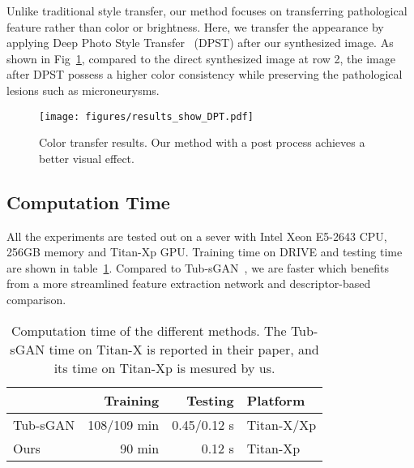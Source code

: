 \documentclass[letterpaper]{article} %
\begin{document}
        Unlike traditional style transfer,  our method focuses on transferring pathological feature rather than color or brightness. Here, we transfer the appearance by applying Deep Photo Style Transfer~\cite{DBLP:conf/cvpr/LuanPSB17} (DPST) after our synthesized image. As shown in Fig~\ref{fig:results_show_DPT}, compared to the direct synthesized image at row 2, the image after DPST possess a higher color consistency while preserving the  pathological lesions such as microneurysms.










	\begin{figure}[h!]
		\begin{center}
			\texttt{[image: figures/results\_show\_DPT.pdf]}
		\end{center}
		\caption{Color transfer results. Our method with a post process achieves a better visual effect. }
		\label{fig:results_show_DPT}
	\end{figure}

	\subsection{Computation Time}

	All the experiments are tested out on a sever with Intel Xeon E5-2643 CPU, 256GB memory and Titan-Xp GPU. Training time on DRIVE and testing time are shown in table~\ref{tab:computation_time}. Compared to Tub-sGAN~\cite{zhao2018synthesizing}, we are faster which benefits from a more streamlined feature extraction network and descriptor-based comparison.

	\begin{table}[h!]
		\begin{center}
		\begin{tabularx}{\columnwidth}{XrrX}
			\hline
			 & Training & Testing & Platform \\ \hline
			Tub-sGAN & 108/109 min & 0.45/0.12 s & Titan-X/Xp \\
			Ours & 90 min & 0.12 s & Titan-Xp \\ \hline
		\end{tabularx}
		\end{center}
		\caption{Computation time of the different methods. The Tub-sGAN time on Titan-X is reported in their paper, and its time on Titan-Xp is mesured by us.}
		\label{tab:computation_time}
	\end{table}
\end{document}
